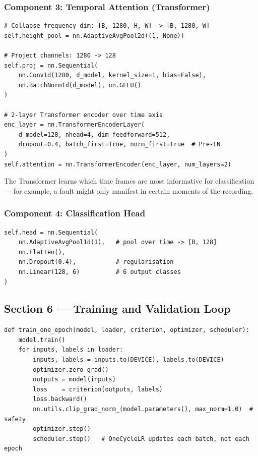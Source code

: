 \documentclass[12pt,a4paper]{article}
\begin{document}
\subsubsection{Component 3: Temporal Attention (Transformer)}

\begin{lstlisting}
# Collapse frequency dim: [B, 1280, H, W] -> [B, 1280, W]
self.height_pool = nn.AdaptiveAvgPool2d((1, None))

# Project channels: 1280 -> 128
self.proj = nn.Sequential(
    nn.Conv1d(1280, d_model, kernel_size=1, bias=False),
    nn.BatchNorm1d(d_model), nn.GELU()
)

# 2-layer Transformer encoder over time axis
enc_layer = nn.TransformerEncoderLayer(
    d_model=128, nhead=4, dim_feedforward=512,
    dropout=0.4, batch_first=True, norm_first=True  # Pre-LN
)
self.attention = nn.TransformerEncoder(enc_layer, num_layers=2)
\end{lstlisting}

The Transformer learns which time frames are most informative for classification --- for example, a fault might only manifest in certain moments of the recording.

\subsubsection{Component 4: Classification Head}

\begin{lstlisting}
self.head = nn.Sequential(
    nn.AdaptiveAvgPool1d(1),   # pool over time -> [B, 128]
    nn.Flatten(),
    nn.Dropout(0.4),           # regularisation
    nn.Linear(128, 6)          # 6 output classes
)
\end{lstlisting}

\subsection{Section 6 --- Training and Validation Loop}

\begin{lstlisting}
def train_one_epoch(model, loader, criterion, optimizer, scheduler):
    model.train()
    for inputs, labels in loader:
        inputs, labels = inputs.to(DEVICE), labels.to(DEVICE)
        optimizer.zero_grad()
        outputs = model(inputs)
        loss    = criterion(outputs, labels)
        loss.backward()
        nn.utils.clip_grad_norm_(model.parameters(), max_norm=1.0)  # safety
        optimizer.step()
        scheduler.step()   # OneCycleLR updates each batch, not each epoch
\end{lstlisting}
\end{document}
